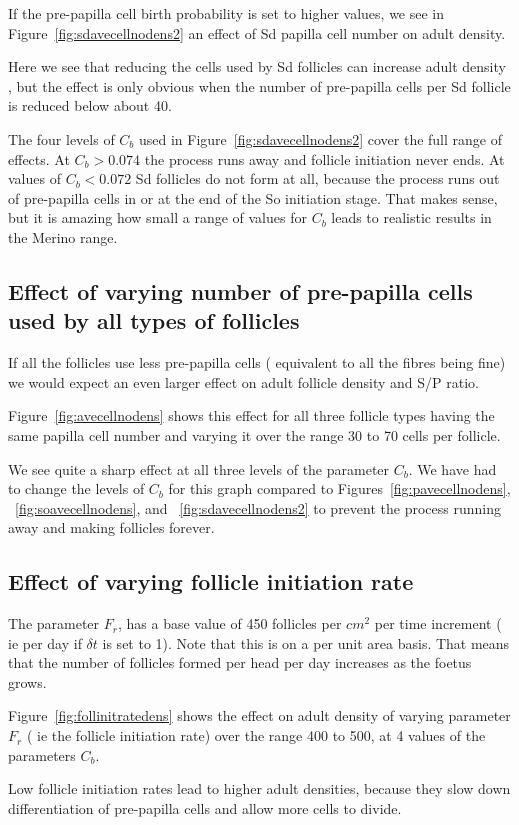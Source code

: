 \documentclass[titlepage]{article}  %
\begin{document}
 If the pre-papilla cell birth probability is set to higher values, we see in Figure~\ref{fig:sdavecellnodens2} an effect of Sd papilla cell number on adult density. 

Here we see that reducing the cells used by Sd follicles can increase adult density  , but the effect is only obvious when the number of pre-papilla cells per Sd follicle is reduced below about 40. 

The four levels of $C_{b}$ used in Figure~\ref{fig:sdavecellnodens2} cover the full range of effects. At $C_{b} > 0.074$ the process runs away and follicle initiation never ends. At values of $C_{b} < 0.072$ Sd follicles do not form at all, because the process runs out of pre-papilla cells in or at the end of the So initiation stage. That makes sense, but it is amazing how small a range of values for $C_{b}$ leads to realistic results in the Merino range. 

\subsection{Effect of varying number of pre-papilla cells used by all types of follicles}
If all the follicles use less pre-papilla cells ( equivalent to all the fibres being fine) we would expect an even larger effect on adult follicle density and S/P ratio. 

Figure~\ref{fig:avecellnodens} shows this effect for all three follicle types having the same papilla cell number and varying it over the range 30 to 70 cells per follicle.

We see quite a sharp effect at all three levels of the parameter $C_{b}$. We have had to change the levels of $C_{b}$ for this graph compared to Figures~\ref{fig:pavecellnodens}, ~\ref{fig:soavecellnodens}, and ~\ref{fig:sdavecellnodens2} to prevent the process running away and making follicles forever.

\subsection{Effect of varying follicle initiation rate}
The parameter $F_{r}$, has a base value of 450 follicles per $cm^{2}$ per time increment ( ie per day if $\delta t$ is set to 1). Note that this is on a per unit area basis. That means that the number of follicles formed per head per day increases as the foetus grows. 

Figure~\ref{fig:follinitratedens} shows the effect on adult density of varying parameter $F_{r}$ ( ie the follicle initiation rate) over the range 400 to 500, at 4 values of the parameters $C_{b}$.

Low follicle initiation rates lead to higher adult densities, because they slow down differentiation of pre-papilla cells and allow more cells to divide. 
\end{document}
